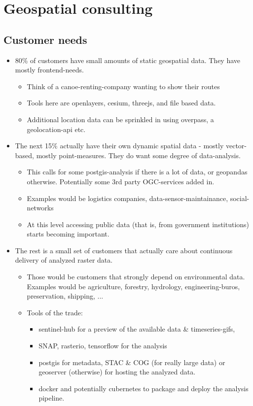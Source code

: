 \section{Geospatial consulting}

\subsection{Customer needs}

\begin{itemize}
    \item 80\% of customers have small amounts of static geospatial data. They have mostly frontend-needs. \begin{itemize}
        \item Think of a canoe-renting-company wanting to show their  routes
        \item Tools here are openlayers, cesium, threejs, and file based data.
        \item Additional location data can be sprinkled in using overpass, a  geolocation-api etc.
    \end{itemize}
    \item The next 15\% actually have their own dynamic spatial data - mostly vector-based, mostly point-measures. 
    They do want some degree of data-analysis. \begin{itemize}
        \item This calls for some postgis-analysis if there is a lot of data, or geopandas otherwise. Potentially some 3rd party OGC-services added in.
        \item Examples would be logistics companies, data-sensor-maintainance, social-networks
        \item At this level accessing public data (that is, from government institutions) starts becoming important.
    \end{itemize}
    \item The rest is a small set of customers that actually care about continuous delivery of analyzed raster data.\begin{itemize}
        \item Those would be customers that strongly depend  on environmental data. 
        Examples would be agriculture, forestry, hydrology, engineering-buros, preservation, shipping, ...
        \item Tools of the trade:\begin{itemize}
            \item sentinel-hub for a preview of the available data \& timeseries-gifs,
            \item SNAP, rasterio, tensorflow for the analysis
            \item postgis for metadata, STAC \& COG (for really large data) or geoserver (otherwise) for hosting the analyzed data.
            \item docker and potentially cubernetes to package and deploy the analysis pipeline.
        \end{itemize}
    \end{itemize}
\end{itemize}